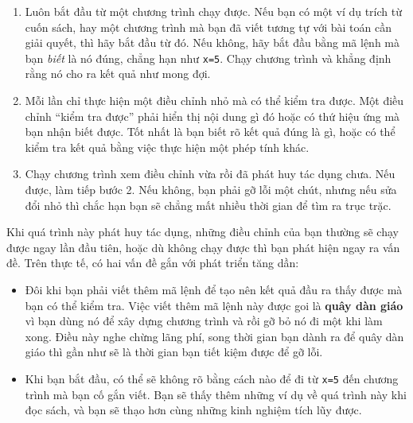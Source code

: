 \documentclass[12pt]{book}
\theoremstyle{exercise}
\begin{document}
\begin{enumerate}

\item Luôn bắt đầu từ một chương trình chạy được. Nếu bạn có một ví dụ trích từ cuốn sách, hay một chương trình mà bạn đã viết tương tự với bài toán cần giải quyết, thì hãy bắt đầu từ đó. Nếu không, hãy bắt đầu bằng mã lệnh mà bạn {\em biết} là nó đúng, chẳng hạn như {\tt x=5}.  Chạy chương trình và khẳng định rằng nó cho ra kết quả như mong đợi.

\item Mỗi lần chỉ thực hiện một điều chỉnh nhỏ mà có thể kiểm tra được. Một điều chỉnh ``kiểm tra được'' phải hiển thị nội dung gì đó hoặc có thứ hiệu ứng mà bạn nhận biết được. Tốt nhất là bạn biết rõ kết quả đúng là gì, hoặc có thể kiểm tra kết quả bằng việc thực hiện một phép tính khác. 


\item Chạy chương trình xem điều chỉnh vừa rồi đã phát huy tác dụng chưa. Nếu được, làm tiếp bước 2. Nếu không, bạn phải gỡ lỗi một chút, nhưng nếu sửa đổi nhỏ thì chắc hạn bạn sẽ chẳng mất nhiều thời gian để tìm ra trục trặc. 

\end{enumerate}

Khi quá trình này phát huy tác dụng, những điều chỉnh của bạn thường sẽ chạy được ngay lần đầu tiên, hoặc dù không chạy được thì bạn phát hiện ngay ra vấn đề. Trên thực tế, có hai vấn đề gắn với phát triển tăng dần:

\begin{itemize}

\item Đôi khi bạn phải viết thêm mã lệnh để tạo nên kết quả đầu ra thấy được mà bạn có thể kiểm tra. Việc viết thêm mã lệnh này được goi là {\bf quây dàn giáo} vì bạn dùng nó để xây dựng chương trình và rồi gỡ bỏ nó đi một khi làm xong. Điều này nghe chừng lãng phí, song thời gian bạn dành ra để quây dàn giáo thì gần như sẽ là thời gian bạn tiết kiệm được để gỡ lỗi.


\item Khi bạn bắt đầu, có thể sẽ không rõ bằng cách nào để đi từ {\tt x=5} đến chương trình mà bạn cố gắn viết. Bạn sẽ thấy thêm những ví dụ về quá trình này khi đọc sách, và bạn sẽ thạo hơn cùng những kinh nghiệm tích lũy được.

\end{itemize}
\end{document}
